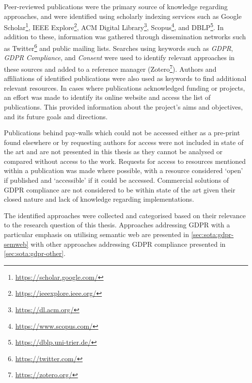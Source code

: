 Peer-reviewed publications were the primary source of knowledge regarding approaches, and were identified using scholarly indexing services such as Google Scholar\footnote{\url{https://scholar.google.com/}}, IEEE Explore\footnote{\url{https://ieeexplore.ieee.org/}}, ACM Digital Library\footnote{\url{https://dl.acm.org/}}, Scopus\footnote{\url{https://www.scopus.com/}}, and DBLP\footnote{\url{https://dblp.uni-trier.de/}}.
In addition to these, information was gathered through dissemination networks such as Twitter\footnote{\url{https://twitter.com/}} and public mailing lists.
Searches using keywords such as \textit{GDPR}, \textit{GDPR Compliance}, and \textit{Consent} were used to identify relevant approaches in these sources and added to a reference manager (Zotero\footnote{\url{https://zotero.org/}}).
Authors and affiliations of identified publications were also used as keywords to find additional relevant resources.
In cases where publications acknowledged funding or projects, an effort was made to identify its online website and access the list of publications. This provided information about the project's aims and objectives, and its future goals and directions. 

Publications behind pay-walls which could not be accessed either as a pre-print found elsewhere or by requesting authors for access were not included in state of the art and are not presented in this thesis as they cannot be analysed or compared without access to the work. Requests for access to resources mentioned within a publication was made where possible, with a resource considered `open' if published and `accessible' if it could be accessed. Commercial solutions of GDPR compliance are not considered to be within state of the art given their closed nature and lack of knowledge regarding implementations.

The identified approaches were collected and categorised based on their relevance to the research question of this thesis.
Approaches addressing GDPR with a particular emphasis on utilising semantic web are presented in \autoref{sec:sota:gdpr-semweb} with other approaches addressing GDPR compliance presented in \autoref{sec:sota:gdpr-other}.

